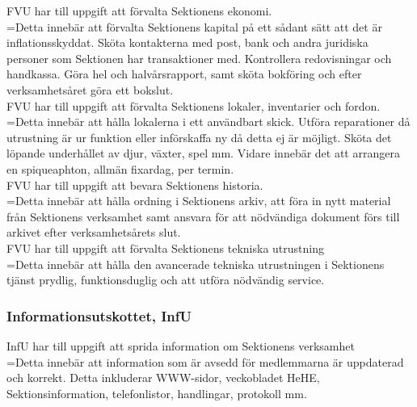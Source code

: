 \documentclass[10pt]{article}
\begin{document}
FVU har till uppgift att förvalta Sektionens ekonomi.\\

\hangindent=\parindent Detta innebär att förvalta Sektionens kapital på
ett sådant sätt att det är inflationsskyddat. Sköta kontakterna med post,
bank och andra juridiska personer som Sektionen har transaktioner med.
Kontrollera redovisningar och handkassa. Göra hel och halvårsrapport,
samt sköta bokföring och efter verksamhetsåret göra ett bokslut.\\

\noindent FVU har till uppgift att förvalta Sektionens lokaler, inventarier
och fordon.\\

\hangindent=\parindent Detta innebär att hålla lokalerna i ett användbart
skick. Utföra reparationer då utrustning är ur funktion eller införskaffa
ny då detta ej är möjligt. Sköta det löpande underhållet av djur, växter,
spel mm. Vidare innebär det att arrangera en spiqueaphton, allmän fixardag,
per termin. \\

\noindent FVU har till uppgift att bevara Sektionens historia. \\

\hangindent=\parindent Detta innebär att hålla ordning i Sektionens arkiv,
att föra in nytt material från Sektionens verksamhet samt ansvara för att
nödvändiga dokument förs till arkivet efter verksamhetsårets slut. \\

\noindent FVU har till uppgift att förvalta Sektionens tekniska utrustning \\

\hangindent=\parindent Detta innebär att hålla den avancerade tekniska
utrustningen i Sektionens tjänst prydlig, funktionsduglig och att utföra
nödvändig service.

\subsubsection{Informationsutskottet, InfU}

InfU har till uppgift att sprida information om Sektionens verksamhet \\

\hangindent=\parindent Detta innebär att information som är avsedd för
medlemmarna är uppdaterad och korrekt. Detta inkluderar WWW-sidor, veckobladet HeHE,
Sektionsinformation, telefonlistor, handlingar, protokoll mm. \\
\end{document}
